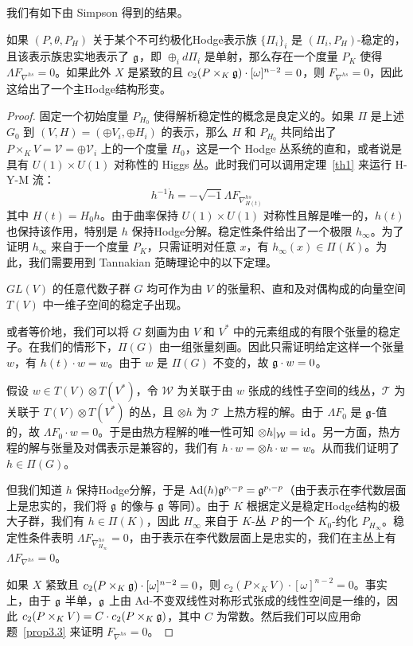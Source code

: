 我们有如下由 Simpson 得到的结果。

\begin{theorem}\label{prop8.1}
如果 $(P, \theta, P_H)$ 关于某个不可约极化Hodge表示族 $\{\Pi_i\}_i$ 是 $(\Pi_i, P_H)$-稳定的，且该表示族忠实地表示了 $\mathfrak{g}$，即 $\oplus_i d\Pi_i$ 是单射，那么存在一个度量 $P_K$ 使得 $\Lambda F_{\nabla^{hs}} = 0$。如果此外 $X$ 是紧致的且 $c_2(P \times_K \mathfrak{g}) \cdot [\omega]^{n-2} = 0$，则 $F_{\nabla^{hs}} = 0$，因此这给出了一个主Hodge结构形变。
\end{theorem}

\begin{proof}
固定一个初始度量 $P_{H_0}$ 使得解析稳定性的概念是良定义的。如果 $\Pi$ 是上述 $G_0$ 到 $(V, H) = (\oplus V_i, \oplus H_i)$ 的表示，那么 $H$ 和 $P_{H_0}$ 共同给出了 $P \times_K V = \mathcal{V} = \oplus \mathcal{V}_i$ 上的一个度量 $H_0$，这是一个 Hodge 丛系统的直和，或者说是具有 $U(1) \times U(1)$ 对称性的 Higgs 丛。此时我们可以调用定理~\ref{th1} 来运行 H-Y-M 流：
\[ h^{-1}\dot{h} = -\sqrt{-1}\Lambda F_{\nabla^{hs}_{H(t)}} \]
其中 $H(t) = H_0h$。由于曲率保持 $U(1) \times U(1)$ 对称性且解是唯一的，$h(t)$ 也保持该作用，特别是 $h$ 保持Hodge分解。稳定性条件给出了一个极限 $h_\infty$。为了证明 $h_\infty$ 来自于一个度量 $P_K$，只需证明对任意 $x$，有 $h_\infty(x) \in \Pi(K)$。为此，我们需要用到 Tannakian 范畴理论中的以下定理。

\begin{theorem}[Chevalley]
$GL(V)$ 的任意代数子群 $G$ 均可作为由 $V$ 的张量积、直和及对偶构成的向量空间 $T(V)$ 中一维子空间的稳定子出现。
\end{theorem}

或者等价地，我们可以将 $G$ 刻画为由 $V$ 和 $V^*$ 中的元素组成的有限个张量的稳定子。在我们的情形下，$\Pi(G)$ 由一组张量刻画。因此只需证明给定这样一个张量 $w$，有 $h(t) \cdot w = w$。由于 $w$ 是 $\Pi(G)$ 不变的，故 $\mathfrak{g} \cdot w = 0$。

假设 $w \in T(V) \otimes T(V^*)$，令 $\mathcal{W}$ 为关联于由 $w$ 张成的线性子空间的线丛，$\mathcal{T}$ 为关联于 $T(V) \otimes T(V^*)$ 的丛，且 $\otimes h$ 为 $\mathcal{T}$ 上热方程的解。由于 $\Lambda F_0$ 是 $\mathfrak{g}$-值的，故 $\Lambda F_0 \cdot w = 0$。于是由热方程解的唯一性可知 $\otimes h|_{\mathcal{W}} = \mathrm{id}$。另一方面，热方程的解与张量及对偶表示是兼容的，我们有 $h \cdot w = \otimes h \cdot w = w$。从而我们证明了 $h \in \Pi(G)$。

但我们知道 $h$ 保持Hodge分解，于是 $\operatorname{Ad}(h)\mathfrak{g}^{p,-p} = \mathfrak{g}^{p,-p}$（由于表示在李代数层面上是忠实的，我们将 $\mathfrak{g}$ 的像与 $\mathfrak{g}$ 等同）。由于 $K$ 根据定义是稳定Hodge结构的极大子群，我们有 $h \in \Pi(K)$，因此 $H_\infty$ 来自于 $K$-丛 $P$ 的一个 $K_0$-约化 $P_{H_\infty}$。稳定性条件表明 $\Lambda F_{\nabla^{hs}_{H_\infty}} = 0$，由于表示在李代数层面上是忠实的，我们在主丛上有 $\Lambda F_{\nabla^{hs}} = 0$。

如果 $X$ 紧致且 $c_2(P \times_K \mathfrak{g}) \cdot [\omega]^{n-2} = 0$，则 $c_2(P \times_K V) \cdot [\omega]^{n-2} = 0$。事实上，由于 $\mathfrak{g}$ 半单，$\mathfrak{g}$ 上由 Ad-不变双线性对称形式张成的线性空间是一维的，因此 $c_2(P \times_K V) = C \cdot c_2(P \times_K \mathfrak{g})$，其中 $C$ 为常数。然后我们可以应用命题~\ref{prop3.3} 来证明 $F_{\nabla^{hs}} = 0$。
\end{proof}
